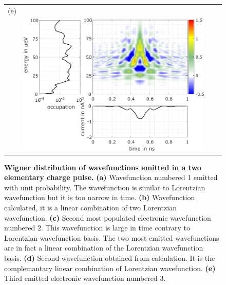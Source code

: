 \begin{figure}[hptb]
\begin{center}
\begin{tabular}{c c c c}
			(e) & & & \\
			& \includegraphics[width = 6.5 cm]{./chap1/wannierwigData_leviton_40ps_2e_51mK_Projected_Gradient_Method-el-2} & &
		\end{tabular} 
	\end{center}
	\caption{ \textbf{Wigner distribution of wavefunctions emitted in a two elementary charge pulse.} \textbf{(a)} Wavefunction numbered 1 emitted with unit probability. %
	The wavefunction is similar to Lorentzian wavefunction but it is too narrow in time. \textbf{(b)} Wavefunction calculated, it is a linear combination of two Lorentzian wavefunction. \textbf{(c)} Second most populated electronic wavefunction numbered 2. This wavefunction is large in time contrary to Lorentzian wavefunction basis. The two most emitted wavefunctions are in fact a linear combination of the Lorentzian wavefunction basis. \textbf{(d)} Second wavefunction obtained from calculation. It is the complemantary linear combination of Lorentzian wavefunction.%
	\textbf{(e)} Third emitted electronic wavefunction numbered 3.}
	\label{fig: wannier du 2e 40ps}
\end{figure}


